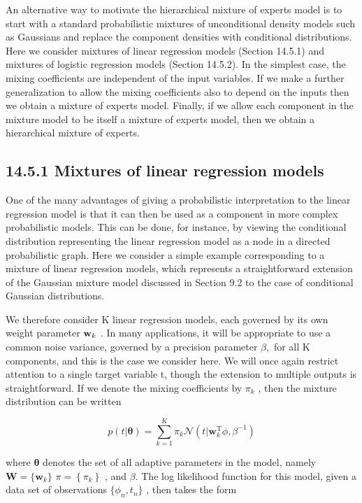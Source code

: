 \documentclass[
  10
]{article}
\begin{document}
An alternative way to motivate the hierarchical mixture of experts model
is to start with a standard probabilistic mixtures of unconditional
density models such as Gaussians and replace the component densities
with conditional distributions. Here we consider mixtures of linear
regression models (Section 14.5.1) and mixtures of logistic regression
models (Section 14.5.2). In the simplest case, the mixing coefficients
are independent of the input variables. If we make a further
generalization to allow the mixing coefficients also to depend on the
inputs then we obtain a mixture of experts model. Finally, if we allow
each component in the mixture model to be itself a mixture of experts
model, then we obtain a hierarchical mixture of experts.

\subsection{14.5.1 Mixtures of linear regression
models}\label{mixtures-of-linear-regression-models}

One of the many advantages of giving a probabilistic interpretation to
the linear regression model is that it can then be used as a component
in more complex probabilistic models. This can be done, for instance, by
viewing the conditional distribution representing the linear regression
model as a node in a directed probabilistic graph. Here we consider a
simple example corresponding to a mixture of linear regression models,
which represents a straightforward extension of the Gaussian mixture
model discussed in Section 9.2 to the case of conditional Gaussian
distributions.

We therefore consider K linear regression models, each governed by its
own weight parameter \({ \bf w } _ { k }\) . In many applications, it
will be appropriate to use a common noise variance, governed by a
precision parameter \(\beta ,\) for all K components, and this is the
case we consider here. We will once again restrict attention to a single
target variable t, though the extension to multiple outputs is
straightforward. If we denote the mixing coefficients by \(\pi _ { k }\)
, then the mixture distribution can be written

\[
p (t | \pmb {\theta}) = \sum_ {k = 1} ^ {K} \pi_ {k} \mathcal {N} (t | \mathbf {w} _ {k} ^ {\mathrm{T}} \phi , \beta^ {- 1})\tag{14.34}
\]

where \(\pmb \theta\) denotes the set of all adaptive parameters in the
model, namely \(\mathbf { W } = \{ \mathbf { w } _ { k } \}\)
\(\pi = \left\{ \pi _ { k } \right\}\) , and \(\beta .\) The log
likelihood function for this model, given a data set of observations
\(\{ \phi _ { n } , t _ { n } \}\) , then takes the form
\end{document}
